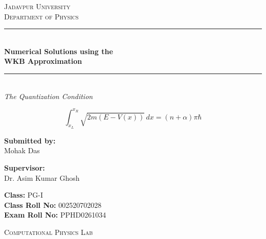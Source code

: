 \documentclass[12pt, a4paper, twoside]{article}
\begin{document}
    \begin{titlepage}
        \centering

        \vspace*{\fill}
        \Huge \textsc{\textcolor{navyblue}{Jadavpur University}}\\
        \LARGE \textsc{Department of Physics}\\[1cm]

        \textcolor{navyblue}{\rule{\linewidth}{0.8mm}} \\[0.4cm] 
        \Huge \textbf{\textcolor{navyblue}{Numerical Solutions using the \\ WKB Approximation}} \\[0.2cm]
        \textcolor{navyblue}{\rule{\linewidth}{0.8mm}} \\[1.5cm] 

        \large \textit{The Quantization Condition}\\[0.5cm]

        \begin{tcolorbox}[colback=navyblue!5!white, colframe=navyblue, width=0.8\textwidth, boxrule=0.5mm, arc=2mm, auto outer arc]
            \centering \Large
            $$ \int_{x_L}^{x_R} \sqrt{2m(E - V(x))} \, dx = \left(n + \alpha\right) \pi \hbar $$
        \end{tcolorbox}

        \vspace{1.5cm}

        \noindent
        \begin{minipage}{0.4\textwidth}
            \begin{flushleft} \Large
                \textbf{Submitted by:}\\
                \textcolor{navyblue}{Mohak Das}\\
            \end{flushleft}
        \end{minipage}
        \begin{minipage}{0.4\textwidth}
            \begin{flushright} \Large
                \textbf{Supervisor:} \\
                Dr. Asim Kumar Ghosh\\
                \vspace{0.6cm}
            \end{flushright}
        \end{minipage}
        \vspace{1cm}

        \textbf{Class:} PG-I\\
        \textbf{Class Roll No:} 002520702028\\
        \textbf{Exam Roll No:} PPHD0261034
        \vspace{1.5cm}

        \textsc{Computational Physics Lab}

        \vspace*{\fill}


    \end{titlepage}
    \thispagestyle{empty}
\end{document}

